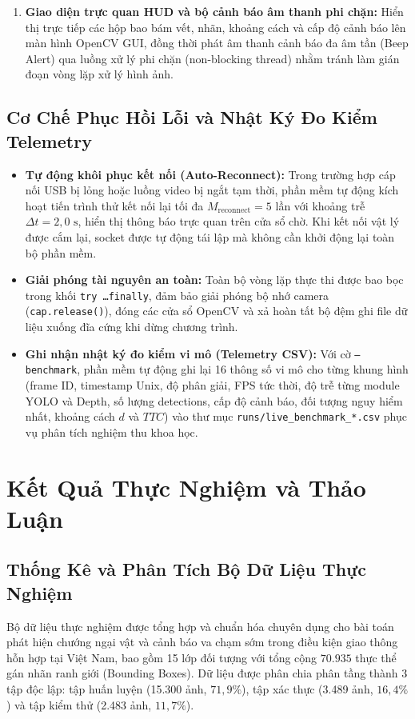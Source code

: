 \documentclass[12pt,a4paper]{article}
\begin{document}
\begin{enumerate}
    \item \textbf{Giao diện trực quan HUD và bộ cảnh báo âm thanh phi chặn:} Hiển thị trực tiếp các hộp bao bám vết, nhãn, khoảng cách và cấp độ cảnh báo lên màn hình OpenCV GUI, đồng thời phát âm thanh cảnh báo đa âm tần (Beep Alert) qua luồng xử lý phi chặn (non-blocking thread) nhằm tránh làm gián đoạn vòng lặp xử lý hình ảnh.
\end{enumerate}

\subsection{Cơ Chế Phục Hồi Lỗi và Nhật Ký Đo Kiểm Telemetry}
\begin{itemize}
    \item \textbf{Tự động khôi phục kết nối (Auto-Reconnect):} Trong trường hợp cáp nối USB bị lỏng hoặc luồng video bị ngắt tạm thời, phần mềm tự động kích hoạt tiến trình thử kết nối lại tối đa $M_{\text{reconnect}} = 5$ lần với khoảng trễ $\Delta t = 2,0\text{ s}$, hiển thị thông báo trực quan trên cửa sổ chờ. Khi kết nối vật lý được cắm lại, socket được tự động tái lập mà không cần khởi động lại toàn bộ phần mềm.
    \item \textbf{Giải phóng tài nguyên an toàn:} Toàn bộ vòng lặp thực thi được bao bọc trong khối \texttt{try \dots finally}, đảm bảo giải phóng bộ nhớ camera (\texttt{cap.release()}), đóng các cửa sổ OpenCV và xả hoàn tất bộ đệm ghi file dữ liệu xuống đĩa cứng khi dừng chương trình.
    \item \textbf{Ghi nhận nhật ký đo kiểm vi mô (Telemetry CSV):} Với cờ \texttt{--benchmark}, phần mềm tự động ghi lại 16 thông số vi mô cho từng khung hình (frame ID, timestamp Unix, độ phân giải, FPS tức thời, độ trễ từng module YOLO và Depth, số lượng detections, cấp độ cảnh báo, đối tượng nguy hiểm nhất, khoảng cách $d$ và $TTC$) vào thư mục \texttt{runs/live\_benchmark\_*.csv} phục vụ phân tích nghiệm thu khoa học.
\end{itemize}

\newpage
\section{Kết Quả Thực Nghiệm và Thảo Luận}
\label{sec:ket_qua_va_thao_luan}

\subsection{Thống Kê và Phân Tích Bộ Dữ Liệu Thực Nghiệm}
Bộ dữ liệu thực nghiệm được tổng hợp và chuẩn hóa chuyên dụng cho bài toán phát hiện chướng ngại vật và cảnh báo va chạm sớm trong điều kiện giao thông hỗn hợp tại Việt Nam, bao gồm 15 lớp đối tượng với tổng cộng $70.935$ thực thể gán nhãn ranh giới (Bounding Boxes). Dữ liệu được phân chia phân tầng thành 3 tập độc lập: tập huấn luyện (15.300 ảnh, $71,9\%$), tập xác thực (3.489 ảnh, $16,4\%$) và tập kiểm thử (2.483 ảnh, $11,7\%$).
\end{document}
